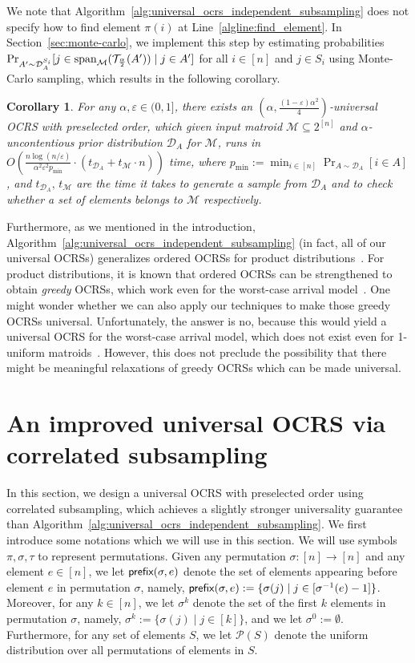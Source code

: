 \documentclass[11pt]{article}
\newcommand{\D}{\mathcal D}
\newcommand{\M}{{\mathcal M}}
\newcommand{\cP}{\mathcal P}
\newcommand{\T}{{\mathcal T}}
\newcommand{\eps}{\varepsilon}
\newcommand{\pref}{\textnormal{\sffamily prefix}}
\newcommand{\spa}{\textnormal{span}}
\newtheorem{corollary}[theorem]{Corollary}
\begin{document}
We note that Algorithm~\ref{alg:universal_ocrs_independent_subsampling} does not specify how to find element $\pi(i)$ at Line~\ref{algline:find_element}. In Section~\ref{sec:monte-carlo}, we implement this step by estimating probabilities ${\Pr}_{A'\sim \D_A^{S_i}}[j\in \spa_{\M}(\T_{\frac{\alpha}{2}}(A'))\mid j\in A']$ for all $i\in[n]$ and $j\in S_i$ using Monte-Carlo sampling, which results in the following corollary.
\begin{corollary}\label{cor:explicit_universal_OCRS}
For any $\alpha,\eps\in(0,1]$, there exists an $(\alpha,\frac{(1-\eps)\alpha^2}{4})$-universal OCRS with preselected order, which given input matroid $\M\subseteq2^{[n]}$ and $\alpha$-uncontentious prior distribution $\D_A$ for $\M$, runs in $O\left(\frac{n\log(n/\eps)}{\alpha^2\eps^2 p_{\min}}\cdot (t_{\D_A}+t_{\M}\cdot n)\right)$ time, where $p_{\min}:=\min_{i\in[n]}\Pr_{A\sim\D_A}[i\in A]$, and $t_{\D_A},\,t_{\M}$ are the time it takes to generate a sample from $\D_A$ and to check whether a set of elements belongs to $\M$ respectively.
\end{corollary}

Furthermore, as we mentioned in the introduction, Algorithm~\ref{alg:universal_ocrs_independent_subsampling} (in fact, all of our universal OCRSs) generalizes ordered OCRSs for product distributions~\citep{chekuri2014submodular,gupta2013stochastic}. For product distributions, it is known that ordered OCRSs can be strengthened to obtain \emph{greedy} OCRSs, which work even for the worst-case arrival model~\citep[Theorem 2.1]{feldman2021online}. One might wonder whether we can also apply our techniques to make those greedy OCRSs universal. Unfortunately, the answer is no, because this would yield a universal OCRS for the worst-case arrival model, which does not exist even for 1-uniform matroids~\citep[Theorem 5.7]{dughmi2020outer}. However, this does not preclude the possibility that there might be meaningful relaxations of greedy OCRSs which can be made universal. 
\section{An improved universal OCRS via correlated subsampling}\label{sec:ocrs_correlated_subsampling}
In this section, we design a universal OCRS with preselected order using correlated subsampling, which achieves a slightly stronger universality guarantee than Algorithm~\ref{alg:universal_ocrs_independent_subsampling}. We first introduce some notations which we will use in this section. We will use symbols $\pi,\sigma,\tau$ to represent permutations. Given any permutation $\sigma:[n]\to[n]$ and any element $e\in[n]$, we let $\pref(\sigma,e)$ denote the set of elements appearing before element $e$ in permutation $\sigma$, namely, $\pref(\sigma,e) := \{\sigma(j) \mid j\in[\sigma^{-1}(e)-1]\}$. Moreover, for any $k\in[n]$, we let $\sigma^k$ denote the set of the first $k$ elements in permutation $\sigma$, namely, $\sigma^k:=\{\sigma(j)\mid j\in[k]\}$, and we let $\sigma^0:=\emptyset$. Furthermore, for any set of elements $S$, we let $\cP(S)$ denote the uniform distribution over all permutations of elements in $S$.
\end{document}

